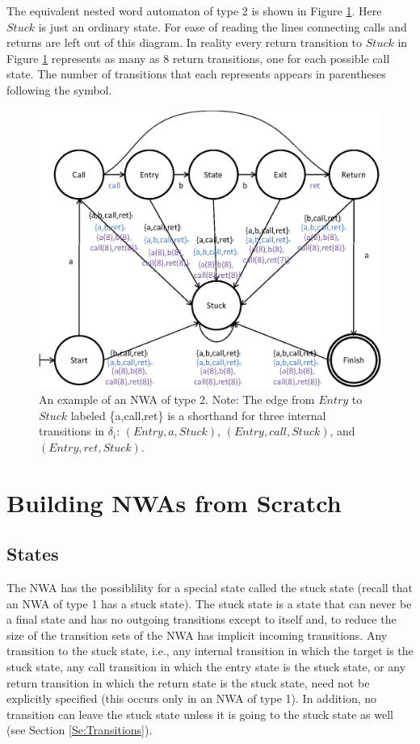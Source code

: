 \documentclass{llncs}
\begin{document}
The equivalent nested word automaton of type 2 is shown in Figure \ref{Fig:Example2}.  Here $Stuck$ is just an ordinary state.  For ease of reading the lines connecting calls and returns are left out of this diagram.  In reality every return transition to $Stuck$ in Figure \ref{Fig:Example2} represents as many as 8 return transitions, one for each possible call state.  The number of transitions that each represents appears in parentheses following the symbol.

\begin{figure}[htb]
  \centering
    \includegraphics[width=12cm]{Figures/Figure2.eps}
  \caption{An example of an NWA of type 2.  Note: The edge from $Entry$ to $Stuck$ labeled \{a,call,ret\} is a shorthand for three internal transitions in $\delta_i$: $(Entry,a,Stuck)$, $(Entry,call,Stuck)$, and $(Entry,ret,Stuck)$.}
  \label{Fig:Example2}
\end{figure}


\section{Building NWAs from Scratch}
\label{Se:Scratch}

\subsection{States}
\label{Se:States}

The NWA has the possiblility for a special state called the stuck state (recall that an NWA of type 1 has a stuck state).  The stuck state is a state that can never be a final state and has no outgoing transitions except to itself and, to reduce the size of the transition sets of the NWA has implicit incoming transitions.  Any transition to the stuck state, i.e., any internal transition in which the target is the stuck state, any call transition in which the entry state is the stuck state, or any return transition in which the return state is the stuck state, need not be explicitly specified (this occurs only in an NWA of type 1).  In addition, no transition can leave the stuck state unless it is going to the stuck state as well (see Section \ref{Se:Transitions}). \\
\end{document}
